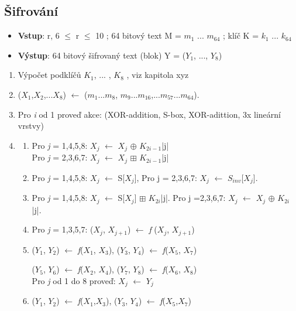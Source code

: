 \documentclass[12pt,a4paper]{article}
\begin{document}
{\subsection{Šifrování}}

\begin{itemize}  
\item \textbf{Vstup}: r, 6 $\leq$ r $\leq$ 10 ; 64 bitový text M = $m_{1}$ ... $m_{64}$ ; klíč K = $k_{1}$ ... $k_{64}$
\item \textbf{Výstup}: 64 bitový šifrovaný text (blok) Y = ($Y_{1}$, ..., $Y_{8}$) 
\end{itemize}

\begin{enumerate}
\item Výpočet podklíčů $K_{1}$, ... , $K_{8}$ , viz kapitola xyz
\item ($X_{1}$,$X_{2}$,...$X_{8}$) 
$\leftarrow$
($m_{1}$...$m_{8}$, $m_{9}$...$m_{16}$,...$m_{57}$...$m_{64}$).
\item Pro \emph{i} od 1 proveď akce: (XOR-addition, S-box, XOR-adittion, 3x lineární vrstvy)
\item

\begin{enumerate}
\item Pro \emph{j} = 1,4,5,8: $X_{j}$ $\leftarrow$ $X_{j}$ $\oplus$ $K_{2i-1}$|j|\\
Pro \emph{j} = 2,3,6,7: $X_{j}$ $\leftarrow$ $X_{j}$ $\boxplus$ $K_{2i-1}$|j|
\item Pro \emph{j} = 1,4,5,8: $X_{j}$ $\leftarrow$ S[$X_{j}$], Pro j = 2,3,6,7: $X_{j}$ $\leftarrow$ $S_{inv}$[$X_{j}$].

\item Pro \emph{j} = 1,4,5,8: $X_{j}$ $\leftarrow$ S[$X_{j}$] $\boxplus$ $K_{2i}$|j|. Pro j =2,3,6,7: $X_{j}$ $\leftarrow$ $X_{j}$ $\oplus$ $K_{2i}$|j|.

\item Pro \emph{j} = 1,3,5,7: ($X_{j}$, $X_{j+1}$) $\leftarrow$ \emph{f} ($X_{j}$, $X_{j+1}$)

\item ($Y_{1}$, $Y_{2}$) $\leftarrow$ \emph{f}($X_{1}$, $X_{3}$), ($Y_{3}$, $Y_{4}$) $\leftarrow$ \emph{f}($X_{5}$, $X_{7}$)

($Y_{5}$, $Y_{6}$) $\leftarrow$ \emph{f}($X_{2}$, $X_{4}$), ($Y_{7}$, $Y_{8}$) $\leftarrow$ \emph{f}($X_{6}$, $X_{8}$)
\\
Pro  \emph{j} od 1 do 8 proveď: $X_{j}$ $\leftarrow$ $Y_{j}$
\item ($Y_{1}$, $Y_{2}$) $\leftarrow$ \emph{f}($X_{1}$,$X_{3}$), ($Y_{3}$, $Y_{4}$) $\leftarrow$ \emph{f}($X_{5}$,$X_{7}$)


\end{enumerate}
\end{enumerate}
\end{document}

